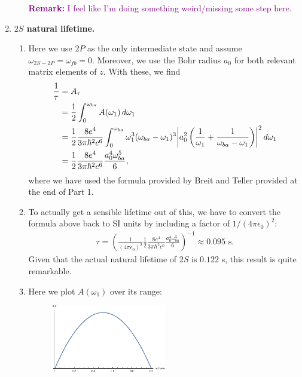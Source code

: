 \documentclass{article}
\theoremstyle{definition}
\newcommand{\f}[2]{\frac{#1}{#2}}
\newcommand{\lp}{\left(}
\newcommand{\rp}{\right)}
\begin{document}
\begin{enumerate}
\begin{enumerate}[label=(\roman*)]
		
		\textcolor{purple}{\textbf{Remark:} I feel like I'm doing something weird/missing some step here.}
		
		
	\end{enumerate}
	
	
	\item \textbf{$2S$ natural lifetime.}
	
	\begin{enumerate}[label=(\roman*)]
		\item Here we use $2P$ as the only intermediate state and assume $\omega_{2S-2P} = \omega_{fb} =  0$. Moreover, we use the Bohr radius $a_0$ for both relevant matrix elements of $z$. With these, we find 
		\begin{align*}
		\f{1}{\tau} &= A_\tau\\
		&= \f{1}{2}\int^{\omega_{ba}}_0  A(\omega_1)\,d\omega_1 \\
		&= \f{1}{2}\f{8e^4}{3\pi \hbar^2 c^6} \int_0^{\omega_{ba}} \omega_1^3 (\omega_{ba} - \omega_1)^3  \abs{a_0^2  \lp \f{1}{\omega_1} + \f{1}{\omega_{ba} - \omega_1}\rp}^2\,d\omega_1\\
		&=  \f{1}{2}\f{8e^4}{3\pi \hbar^2 c^6} \f{a_0^4 \omega_{ba}^5}{6},
		\end{align*}  
		where we have used the formula provided by Breit and Teller provided at the end of Part 1. 
		
		\item To actually get a sensible lifetime out of this, we have to convert the formula above back to SI units by including a factor of $1/(4\pi \epsilon_0)^2$:
		\begin{align*}
		\tau = \lp \f{1}{(4\pi\epsilon_0)^2} \f{1}{2}\f{8e^4}{3\pi \hbar^2 c^6} \f{a_0^4 \omega_{ba}^5}{6}\rp^{-1} \approx 0.095 \text{ s}. 
		\end{align*}
		Given that the actual natural lifetime of $2S$ is $0.122$ s, this result is quite remarkable. 
		
		\item Here we plot $A(\omega_1)$ over its range:
		\begin{figure}[!htb]
			\centering
			\includegraphics[width=0.5\textwidth]{aw1.eps}
		\end{figure}

	\end{enumerate}
\end{enumerate}
	
	
\end{document}
